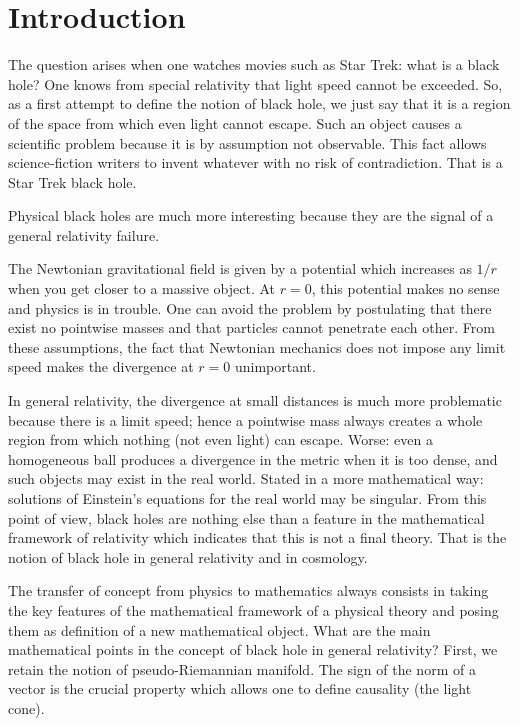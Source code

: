 
\section{Introduction}

The question arises when one watches movies such as Star Trek: what is a black hole? One knows from special relativity that light speed cannot be exceeded. So, as a first attempt to define the notion of black hole, we just say that it is a region of the space from which even light cannot escape. Such an object causes a scientific problem because it is by assumption not observable. This fact allows science-fiction writers to invent whatever with no risk of contradiction. That is a Star Trek black hole.

Physical black holes are much more interesting because they are the signal of a general relativity failure.

The Newtonian gravitational field is given by a potential which increases as $1/r$ when you get closer to a massive object. At $r=0$, this potential makes no sense and physics is in trouble. One can avoid the problem by postulating that there exist no pointwise masses and that particles cannot penetrate each other. From these assumptions, the fact that Newtonian mechanics does not impose any limit speed makes the divergence at $r=0$ unimportant.

In general relativity, the divergence at small distances is much more problematic because there is a limit speed; hence a pointwise mass always creates a whole region from which nothing (not even light) can escape. Worse: even a homogeneous ball produces a divergence in the metric when it is too dense, and such objects may exist in the real world. Stated in a more mathematical way: solutions of Einstein's equations for the real world may be singular. From this point of view, black holes are nothing else than a feature in the mathematical framework of relativity which indicates that this is not a final theory. That is the notion of black hole in general relativity and in cosmology.

The transfer of concept from physics to mathematics always consists in taking the key features of the mathematical framework of a physical theory and posing them as definition of a new mathematical object. What are the main mathematical points in the concept of black hole in general relativity?
First, we retain the notion of pseudo-Riemannian manifold. The sign of the norm of a vector is the crucial property which allows one to define causality (the light cone).

